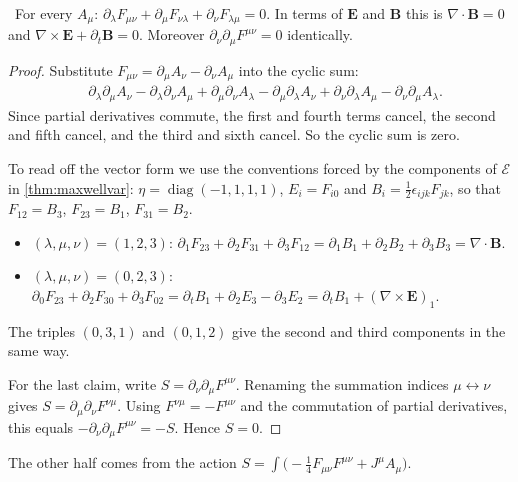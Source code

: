 \begin{theorem}\label{thm:bianchi}\ver\
For every $A_\mu$: $\partial_\lambda F_{\mu\nu}+\partial_\mu F_{\nu\lambda}+\partial_\nu F_{\lambda\mu}=0$. In terms of $\mathbf E$ and $\mathbf B$ this is $\nabla\cdot\mathbf B=0$ and $\nabla\times\mathbf E+\partial_t\mathbf B=0$. Moreover $\partial_\nu\partial_\mu F^{\mu\nu}=0$ identically.
\end{theorem}
\begin{proof}
Substitute $F_{\mu\nu}=\partial_\mu A_\nu-\partial_\nu A_\mu$ into the cyclic sum:
\[
\begin{aligned}
&\partial_\lambda\partial_\mu A_\nu-\partial_\lambda\partial_\nu A_\mu
+\partial_\mu\partial_\nu A_\lambda-\partial_\mu\partial_\lambda A_\nu
+\partial_\nu\partial_\lambda A_\mu-\partial_\nu\partial_\mu A_\lambda .
\end{aligned}
\]
Since partial derivatives commute, the first and fourth terms cancel, the second and fifth cancel, and the third and sixth cancel. So the cyclic sum is zero.

To read off the vector form we use the conventions forced by the components of $\mathcal E$ in \cref{thm:maxwellvar}: $\eta=\operatorname{diag}(-1,1,1,1)$, $E_i=F_{i0}$ and $B_i=\frac12\epsilon_{ijk}F_{jk}$, so that $F_{12}=B_3$, $F_{23}=B_1$, $F_{31}=B_2$.
\begin{itemize}[nosep]
\item $(\lambda,\mu,\nu)=(1,2,3)$: $\partial_1F_{23}+\partial_2F_{31}+\partial_3F_{12}=\partial_1B_1+\partial_2B_2+\partial_3B_3=\nabla\cdot\mathbf B$.
\item $(\lambda,\mu,\nu)=(0,2,3)$: $\partial_0F_{23}+\partial_2F_{30}+\partial_3F_{02}=\partial_tB_1+\partial_2E_3-\partial_3E_2=\partial_tB_1+(\nabla\times\mathbf E)_1$.
\end{itemize}
The triples $(0,3,1)$ and $(0,1,2)$ give the second and third components in the same way.

For the last claim, write $S=\partial_\nu\partial_\mu F^{\mu\nu}$. Renaming the summation indices $\mu\leftrightarrow\nu$ gives $S=\partial_\mu\partial_\nu F^{\nu\mu}$. Using $F^{\nu\mu}=-F^{\mu\nu}$ and the commutation of partial derivatives, this equals $-\partial_\nu\partial_\mu F^{\mu\nu}=-S$. Hence $S=0$.
\end{proof}


The other half comes from the action $S=\int\bigl(-\frac14F_{\mu\nu}F^{\mu\nu}+J^\mu A_\mu\bigr)$.

